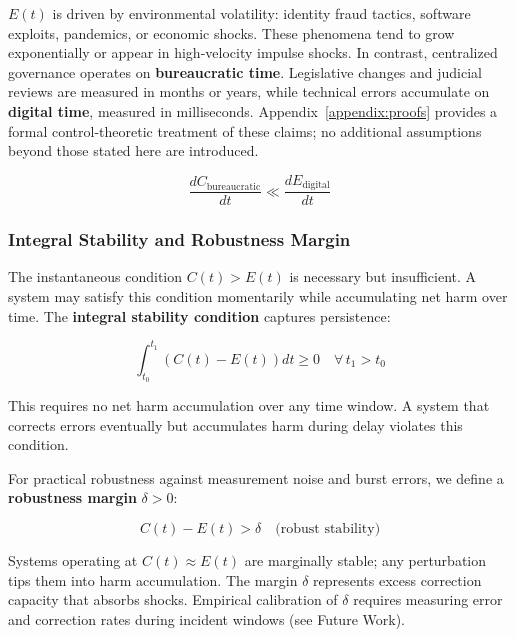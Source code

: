 \documentclass{article}
\begin{document}
$E(t)$ is driven by environmental volatility: identity fraud tactics, software exploits, pandemics, or economic shocks. These phenomena tend to grow exponentially or appear in high-velocity impulse shocks. In contrast, centralized governance operates on \textbf{bureaucratic time}. Legislative changes and judicial reviews are measured in months or years, while technical errors accumulate on \textbf{digital time}, measured in milliseconds. Appendix~\ref{appendix:proofs} provides a formal control-theoretic treatment of these claims; no additional assumptions beyond those stated here are introduced.

\begin{equation}
\frac{dC_{\text{bureaucratic}}}{dt} \ll \frac{dE_{\text{digital}}}{dt}
\end{equation}

\subsubsection{Integral Stability and Robustness Margin}

The instantaneous condition $C(t) > E(t)$ is necessary but insufficient. A system may satisfy this condition momentarily while accumulating net harm over time. The \textbf{integral stability condition} captures persistence:

\begin{equation}
\int_{t_0}^{t_1} \left( C(t) - E(t) \right) dt \geq 0 \quad \forall \, t_1 > t_0
\label{eq:integral-stability}
\end{equation}

This requires no net harm accumulation over any time window. A system that corrects errors eventually but accumulates harm during delay violates this condition.

For practical robustness against measurement noise and burst errors, we define a \textbf{robustness margin} $\delta > 0$:

\begin{equation}
C(t) - E(t) > \delta \quad \text{(robust stability)}
\label{eq:robustness-margin}
\end{equation}

Systems operating at $C(t) \approx E(t)$ are marginally stable; any perturbation tips them into harm accumulation. The margin $\delta$ represents excess correction capacity that absorbs shocks. Empirical calibration of $\delta$ requires measuring error and correction rates during incident windows (see Future Work).
\end{document}
